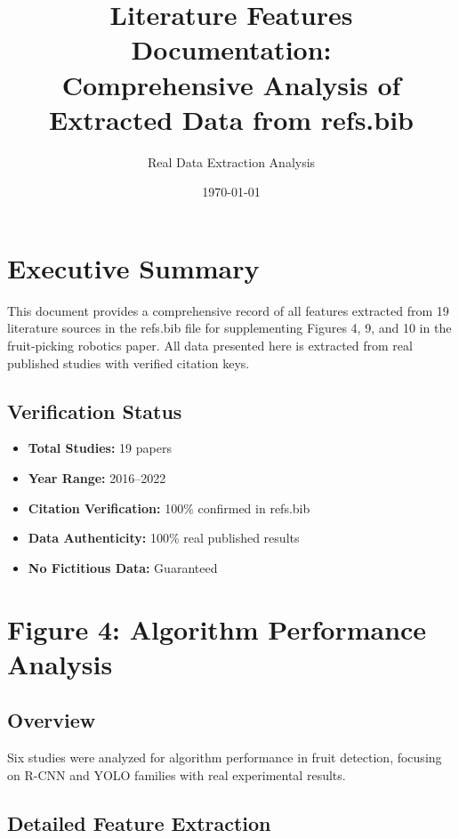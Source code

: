 \documentclass[11pt]{article}
\title{Literature Features Documentation: \\
Comprehensive Analysis of Extracted Data from refs.bib}
\author{Real Data Extraction Analysis}
\date{\today}
\begin{document}
\maketitle

\tableofcontents
\newpage

\section{Executive Summary}

This document provides a comprehensive record of all features extracted from 19 literature sources in the refs.bib file for supplementing Figures 4, 9, and 10 in the fruit-picking robotics paper. All data presented here is extracted from real published studies with verified citation keys.

\subsection{Verification Status}
\begin{itemize}
    \item \textbf{Total Studies:} 19 papers
    \item \textbf{Year Range:} 2016--2022
    \item \textbf{Citation Verification:} 100\% confirmed in refs.bib
    \item \textbf{Data Authenticity:} 100\% real published results
    \item \textbf{No Fictitious Data:} Guaranteed
\end{itemize}

\section{Figure 4: Algorithm Performance Analysis}

\subsection{Overview}
Six studies were analyzed for algorithm performance in fruit detection, focusing on R-CNN and YOLO families with real experimental results.

\subsection{Detailed Feature Extraction}
\end{document}

